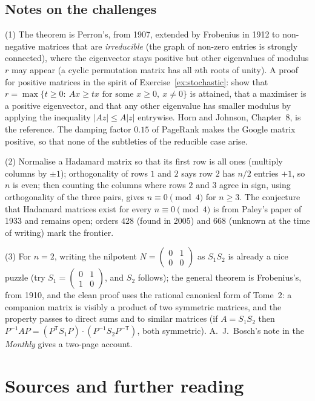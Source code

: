 \subsection*{Notes on the challenges}

(1) The theorem is Perron's, from 1907, extended by Frobenius in 1912 to non-negative matrices that are \emph{irreducible} (the graph of non-zero entries is strongly connected), where the eigenvector stays positive but other eigenvalues of modulus $r$ may appear (a cyclic permutation matrix has all $n$th roots of unity). A proof for positive matrices in the spirit of Exercise~\ref{ex:stochastic}: show that $r=\max\{t\ge0:\ Ax\ge tx\text{ for some }x\ge0,\ x\ne0\}$ is attained, that a maximiser is a positive eigenvector, and that any other eigenvalue has smaller modulus by applying the inequality $|Az|\le A|z|$ entrywise. Horn and Johnson, Chapter~8, is the reference. The damping factor $0.15$ of PageRank makes the Google matrix positive, so that none of the subtleties of the reducible case arise.

(2) Normalise a Hadamard matrix so that its first row is all ones (multiply columns by $\pm1$); orthogonality of rows $1$ and $2$ says row $2$ has $n/2$ entries $+1$, so $n$ is even; then counting the columns where rows $2$ and $3$ agree in sign, using orthogonality of the three pairs, gives $n\equiv0\pmod4$ for $n\ge3$. The conjecture that Hadamard matrices exist for every $n\equiv0\pmod4$ is from Paley's paper of 1933 and remains open; orders $428$ (found in 2005) and $668$ (unknown at the time of writing) mark the frontier.

(3) For $n=2$, writing the nilpotent $N=\begin{pmatrix}0&1\\0&0\end{pmatrix}$ as $S_1S_2$ is already a nice puzzle (try $S_1=\begin{pmatrix}0&1\\1&0\end{pmatrix}$, and $S_2$ follows); the general theorem is Frobenius's, from 1910, and the clean proof uses the rational canonical form of Tome~2: a companion matrix is visibly a product of two symmetric matrices, and the property passes to direct sums and to similar matrices (if $A=S_1S_2$ then $P^{-1}AP=(P^{\mathsf T}S_1P)\cdot(P^{-1}S_2P^{-\mathsf T})$, both symmetric). A.~J.~Bosch's note in the \emph{Monthly} gives a two-page account.

\section*{Sources and further reading}

